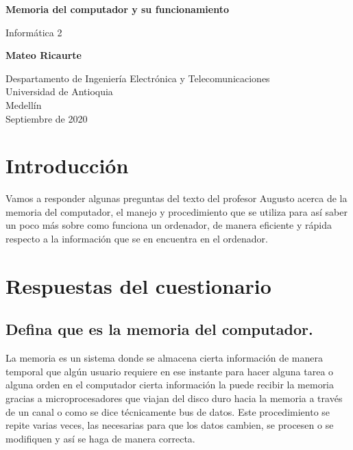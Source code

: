 \documentclass{article}
\begin{document}
\begin{titlepage}
    \begin{center}
        \vspace*{1cm}
            
        \Huge
        \textbf{Memoria del computador y su funcionamiento}
            
        \vspace{0.5cm}
        \LARGE
        Informática 2
            
        \vspace{1.5cm}
            
        \textbf{Mateo Ricaurte}
            
        \vfill
            
        \vspace{0.8cm}
            
        \Large
        Despartamento de Ingeniería Electrónica y Telecomunicaciones\\
        Universidad de Antioquia\\
        Medellín\\
        Septiembre de 2020
            
    \end{center}
\end{titlepage}

\tableofcontents
\newpage
\section{Introducción}
Vamos a responder algunas preguntas del texto del profesor Augusto acerca de la memoria del computador, el manejo y procedimiento que se utiliza para así saber un poco más sobre como funciona un ordenador, de manera eficiente y rápida respecto a la información que se en encuentra en el ordenador.
\newpage
\section{Respuestas del cuestionario} \label{contenido}
\subsection{Defina que es la memoria del computador.}

La memoria es un sistema donde se almacena cierta información de manera temporal que algún usuario requiere en ese instante para hacer alguna tarea o alguna orden en el computador cierta información la puede recibir la memoria gracias a microprocesadores que viajan del disco duro hacia la memoria a través de un canal o como se dice técnicamente bus de datos. Este procedimiento se repite varias veces, las necesarias para que los datos cambien, se procesen o se modifiquen y así se haga de manera correcta.
\end{document}
